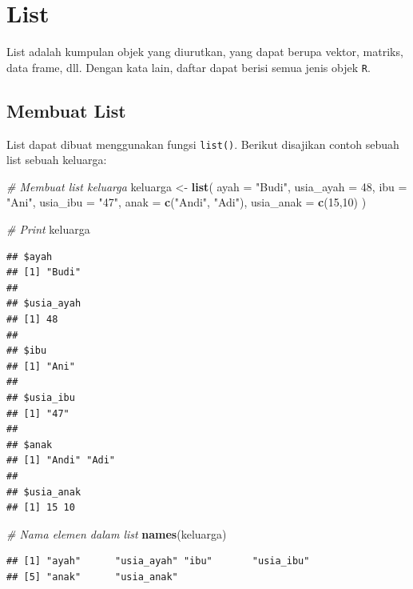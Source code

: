 \documentclass[]{book}
\newenvironment{Shaded}{\begin{snugshade}}{\end{snugshade}}
\newcommand{\KeywordTok}[1]{\textcolor[rgb]{0.13,0.29,0.53}{\textbf{#1}}}
\newcommand{\DataTypeTok}[1]{\textcolor[rgb]{0.13,0.29,0.53}{#1}}
\newcommand{\DecValTok}[1]{\textcolor[rgb]{0.00,0.00,0.81}{#1}}
\newcommand{\StringTok}[1]{\textcolor[rgb]{0.31,0.60,0.02}{#1}}
\newcommand{\CommentTok}[1]{\textcolor[rgb]{0.56,0.35,0.01}{\textit{#1}}}
\newcommand{\NormalTok}[1]{#1}
\begin{document}
\section{List}\label{list}

List adalah kumpulan objek yang diurutkan, yang dapat berupa vektor,
matriks, data frame, dll. Dengan kata lain, daftar dapat berisi semua
jenis objek \texttt{R}.

\subsection{Membuat List}\label{membuat-list}

List dapat dibuat menggunakan fungsi \texttt{list()}. Berikut disajikan
contoh sebuah list sebuah keluarga:

\begin{Shaded}
\begin{Highlighting}[]
\CommentTok{# Membuat list keluarga}
\NormalTok{keluarga <-}\StringTok{ }\KeywordTok{list}\NormalTok{(}
  \DataTypeTok{ayah =} \StringTok{"Budi"}\NormalTok{,}
  \DataTypeTok{usia_ayah =} \DecValTok{48}\NormalTok{,}
  \DataTypeTok{ibu  =} \StringTok{"Ani"}\NormalTok{,}
  \DataTypeTok{usia_ibu =} \StringTok{"47"}\NormalTok{,}
  \DataTypeTok{anak =} \KeywordTok{c}\NormalTok{(}\StringTok{"Andi"}\NormalTok{, }\StringTok{"Adi"}\NormalTok{),}
  \DataTypeTok{usia_anak =} \KeywordTok{c}\NormalTok{(}\DecValTok{15}\NormalTok{,}\DecValTok{10}\NormalTok{)}
\NormalTok{  )}

\CommentTok{# Print}
\NormalTok{keluarga}
\end{Highlighting}
\end{Shaded}

\begin{verbatim}
## $ayah
## [1] "Budi"
## 
## $usia_ayah
## [1] 48
## 
## $ibu
## [1] "Ani"
## 
## $usia_ibu
## [1] "47"
## 
## $anak
## [1] "Andi" "Adi" 
## 
## $usia_anak
## [1] 15 10
\end{verbatim}

\begin{Shaded}
\begin{Highlighting}[]
\CommentTok{# Nama elemen dalam list}
\KeywordTok{names}\NormalTok{(keluarga)}
\end{Highlighting}
\end{Shaded}

\begin{verbatim}
## [1] "ayah"      "usia_ayah" "ibu"       "usia_ibu" 
## [5] "anak"      "usia_anak"
\end{verbatim}
\end{document}
